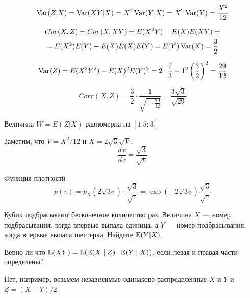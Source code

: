 \begin{solution}
\begin{solution}
\begin{solution}
\begin{solution}
\begin{solution}
\begin{solution}
\begin{solution}
\begin{solution}
\begin{equation}
\operatorname{Var}(Z|X)=\operatorname{Var}(XY|X)=X^2\operatorname{Var}(Y|X)=X^2\operatorname{Var}(Y)=\frac{X^2}{12}
\end{equation}

\begin{multline}
Cov(X,Z)=Cov(X,XY)=E(X^2Y)-E(X)E(XY)=\\
=E(X^2)E(Y)-E(X)E(X)E(Y)=E(Y)\operatorname{Var}(X)=\frac{3}{2}
\end{multline}

\begin{equation}
\operatorname{Var}(Z)=E(X^2Y^2)-E(X)^2E(Y)^2=2\cdot \frac{7}{3}-1^2\left(\frac{3}{2}\right)^2=\frac{29}{12}
\end{equation}

\begin{equation}
Corr(X,Z)=\frac{3}{2}\cdot \frac{1}{\sqrt{1\cdot \frac{29}{12}}}=\frac{3\sqrt{3}}{\sqrt{29}}
\end{equation}

Величина $W=E(Z|X)$ равномерна на $[1.5;3]$

Заметим, что $V=X^{2}/12$ и $X=2\sqrt{3}\sqrt{V}$.
\begin{equation}
\frac{dx}{dv}=\frac{\sqrt{3}}{\sqrt{v}}
\end{equation}

Функция плотности
\begin{equation}
p(v)=p_{X}\left(2\sqrt{3v}\right)\cdot \frac{\sqrt{3}}{\sqrt{v}}=\exp\left(-2\sqrt{3v}\right)\frac{\sqrt{3}}{\sqrt{v}}
\end{equation} 
\end{solution}

\begin{problem}
Кубик подбрасывают бесконечное количество раз. Величина $X$ --- номер подбрасывания, когда впервые выпала единица, а $Y$ --- номер подбрасывания, когда впервые выпала шестерка. Найдите $\mathbb{E}(Y|X)$.
\end{problem} 
\begin{solution} 

\end{solution}

\begin{problem}
Верно ли что $\mathbb{E}(XY)=\mathbb{E}(\mathbb{E}(X\mid Z)\cdot \mathbb{E}(Y\mid X))$, если левая и правая части определены?
\end{problem} 
\begin{solution} 
Нет, например, возьмем независимые одинаково распределенные $X$ и $Y$ и $Z=(X+Y)/2$.
\end{solution}


\end{solution}
\end{solution}
\end{solution}
\end{solution}
\end{solution}
\end{solution}
\end{solution}
